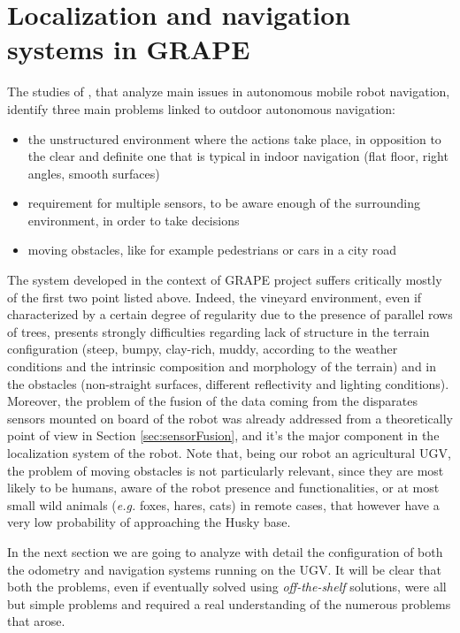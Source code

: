 
\chapter{Localization and navigation systems in GRAPE} \label{chap:localization}

The studies of \cite{outdoorNavigation}, that analyze main issues in autonomous mobile robot navigation, identify three main problems linked to outdoor autonomous navigation:
\begin{itemize}
	\item the unstructured environment where the actions take place, in opposition to the clear and definite one that is typical in indoor navigation (flat floor, right angles, smooth surfaces)
	\item requirement for multiple sensors, to be aware enough of the surrounding environment, in order to take decisions
	\item moving obstacles, like for example pedestrians or cars in a city road
\end{itemize}
The system developed in the context of \ac{GRAPE} project suffers critically mostly of the first two point listed above. Indeed, the vineyard environment, even if characterized by a certain degree of regularity due to the presence of parallel rows of trees, presents strongly difficulties regarding lack of structure in the terrain configuration (steep, bumpy, clay-rich, muddy, according to the weather conditions and the intrinsic composition and morphology of the terrain) and in the obstacles (non-straight surfaces, different reflectivity and lighting conditions). Moreover, the problem of the fusion of the data coming from the disparates sensors mounted on board of the robot was already addressed from a theoretically point of view in Section \ref{sec:sensorFusion}, and it's the major component in the localization system of the robot. Note that, being our robot an agricultural \ac{UGV}, the problem of moving obstacles is not particularly relevant, since they are most likely to be humans, aware of the robot presence and functionalities, or at most small wild animals (\textit{e.g.} foxes, hares, cats) in remote cases, that however have a very low probability of approaching the Husky base.

In the next section we are going to analyze with detail the configuration of both the odometry and navigation systems running on the \ac{UGV}. It will be clear that both the problems, even if eventually solved using \textit{off-the-shelf} solutions, were all but simple problems and required a real understanding of the numerous problems that arose.

